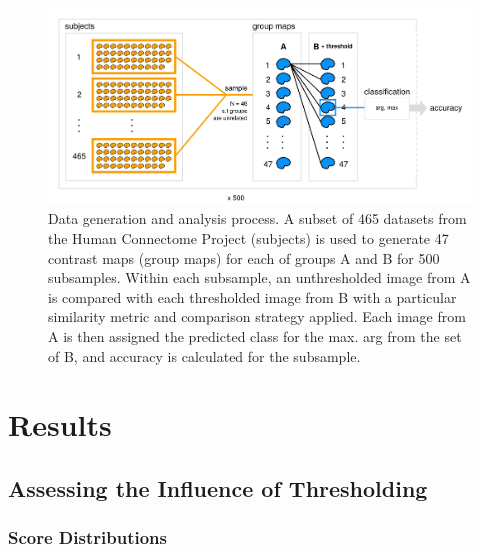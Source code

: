 \documentclass{report}
\begin{document}
\begin{figure}[h!]
\begin{center}
\includegraphics[width=15cm]{images/figure21.png}
\end{center}
 \caption{\label{fig:21} Data generation and analysis process. A subset of 465 datasets from the Human Connectome Project (subjects) is used to generate 47 contrast maps (group maps) for each of groups A and B for 500 subsamples. Within each subsample, an unthresholded image from A is compared with each thresholded image from B with a particular similarity metric and comparison strategy applied.  Each image from A is then assigned the predicted class for the max. arg from the set of B, and accuracy is calculated for the subsample.}
\end{figure}

\section{Results}

\subsection{Assessing the Influence of Thresholding}

\subsubsection{Score Distributions}
\end{document}
